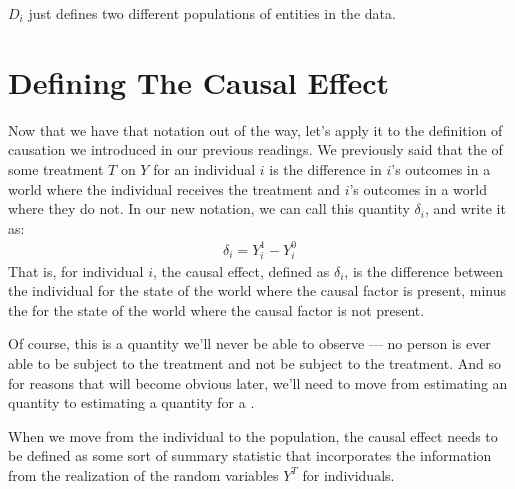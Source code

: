 \documentclass[letterpaper,10pt,english]{jupyterBook}
\begin{document}
\begin{sphinxShadowBox}

\sphinxAtStartPar
\(D_i\) just defines two different populations of entities in the data.
\end{sphinxShadowBox}


\section{Defining The Causal Effect}
\label{\detokenize{35_causal/10_potential_outcomes:defining-the-causal-effect}}
\sphinxAtStartPar
Now that we have that notation out of the way, let’s apply it to the definition of causation we introduced in our previous readings. We previously said that the  of some treatment \(T\) on \(Y\) for an individual \(i\) is the difference in \(i\)’s outcomes in a world where the individual receives the treatment and \(i\)’s outcomes in a world where they do not. In our new notation, we can call this quantity \(\delta_i\), and write it as:
\begin{equation*}
\begin{split}\delta_i = Y^1_i - Y^0_i\end{split}
\end{equation*}
\sphinxAtStartPar
That is, for individual \(i\), the causal effect, defined as \(\delta_i\), is the difference between the individual  for the state of the world where the causal factor is present, minus the  for the state of the world where the causal factor is not present.

\sphinxAtStartPar
Of course, this is  a quantity we’ll never be able to observe — no person is ever able to be  subject to the treatment and not be subject to the treatment. And so for reasons that will become obvious later, we’ll need to move from estimating an  quantity to estimating a quantity for a .

\sphinxAtStartPar
When we move from the individual to the population, the causal effect needs to be defined as some sort of summary statistic that incorporates the information from the realization of the random variables \(Y^{T}\) for  individuals.
\end{document}
